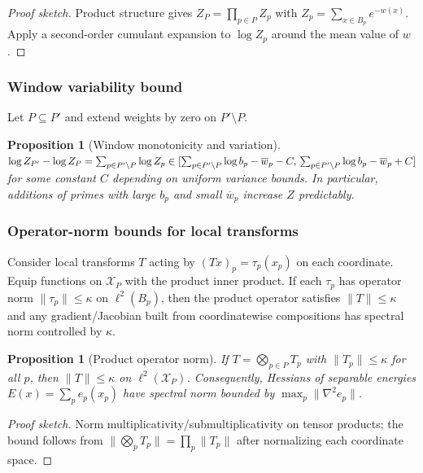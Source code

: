 \documentclass[12pt]{article}
\newtheorem{proposition}[theorem]{Proposition}
\numberwithin{equation}{section}
\begin{document}
\begin{proof}[Proof sketch]
Product structure gives $Z_P=\prod_{p\in P} Z_p$ with $Z_p=\sum_{x\in B_p} e^{-w(x)}$. Apply a second-order cumulant expansion to $\log Z_p$ around the mean value of $w$.
\end{proof}

\subsubsection{Window variability bound}\label{subsec:C5-variability}
Let $P\subseteq P'$ and extend weights by zero on $P'\setminus P$.

\begin{proposition}[Window monotonicity and variation]
$\log Z_{P'}-\log Z_P=\sum_{p\in P'\setminus P} \log Z_p\in [\sum_{p\in P'\setminus P} \log b_p - \overline{w}_p - C,\\ \sum_{p\in P'\setminus P} \log b_p - \overline{w}_p + C]$ for some constant $C$ depending on uniform variance bounds. In particular, additions of primes with large $b_p$ and small $\overline{w}_p$ increase $Z$ predictably.
\end{proposition}

\subsubsection{Operator-norm bounds for local transforms}\label{subsec:C5-operator}
Consider local transforms $T$ acting by $(Tx)_p=\tau_p(x_p)$ on each coordinate. Equip functions on $\mathscr{X}_P$ with the product inner product. If each $\tau_p$ has operator norm $\|\tau_p\|\le \kappa$ on $\ell^2(B_p)$, then the product operator satisfies $\|T\|\le \kappa$ and any gradient/Jacobian built from coordinatewise compositions has spectral norm controlled by $\kappa$.

\begin{proposition}[Product operator norm]
If $T=\bigotimes_{p\in P} T_p$ with $\|T_p\|\le \kappa$ for all $p$, then $\|T\|\le \kappa$ on $\ell^2(\mathscr{X}_P)$. Consequently, Hessians of separable energies $E(x)=\sum_p e_p(x_p)$ have spectral norm bounded by $\max_p \|\nabla^2 e_p\|$.
\end{proposition}

\begin{proof}[Proof sketch]
Norm multiplicativity/submultiplicativity on tensor products; the bound follows from $\|\bigotimes_p T_p\|=\prod_p \|T_p\|$ after normalizing each coordinate space.
\end{proof}
\end{document}
